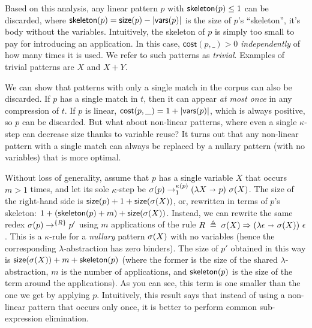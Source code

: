 %
Based on this analysis, any linear pattern $p$
 with $\mathsf{skeleton}(p) \leq 1$ can be discarded,
 where $\mathsf{skeleton}(p) = \mathsf{size}(p) - |\mathsf{vars}(p)|$ is the size of $p$'s ``skeleton'', \ie it's body without the variables.
%
Intuitively, the skeleton of $p$ is simply too small to pay for introducing an application.
%
In this case, $\mathsf{cost}(p,\_) > 0$ \emph{independently} of how many times it is used.
%
We refer to such patterns as \emph{trivial}.
%
Examples of trivial patterns are $X$ and $X + Y$.



%
We can show that patterns with only a single match in the corpus can also be discarded.
%
If $p$ has a single match in $t$,
then it can appear \emph{at most once} in any compression of $t$.
%
If $p$ is linear, $\mathsf{cost}(p, \_) = 1 + |\mathsf{vars}(p)|$,
which is always positive, so $p$ can be discarded.
%
But what about non-linear patterns, where even a single $\kappa$-step can decrease size thanks to variable reuse?
%
It turns out that any non-linear pattern with a single match
can always be replaced by a nullary pattern (with no variables) that is more optimal.

Without loss of generality, assume that $p$ has a single variable $X$ that occurs $m > 1$ times,
and let its sole $\kappa$-step be ${\sigma}({p}) \rightarrow^{\kappa(p)}_1  (\lambda X \ \mathbf{\shortrightarrow}\  p)\  {\sigma}({X})$.
%
The size of the right-hand side is $\mathsf{size}(p) + 1 + \mathsf{size}({\sigma}({X}))$,
or, rewritten in terms of $p$'s skeleton: $1 + (\mathsf{skeleton}(p) + m) + \mathsf{size}({\sigma}({X}))$.
%
Instead, we can rewrite the same redex ${\sigma}({p}) \rightarrow^{\{R\}} p'$
using $m$ applications of the rule $R \;\triangleq\; \sapp{\sigma}{X} \Rightarrow (\lambda \epsilon \bnd \sapp{\sigma}{X})\ \epsilon$.
%
This is a $\kappa$-rule for a \emph{nullary} pattern ${\sigma}({X})$ with no variables
(hence the corresponding $\lambda$-abstraction has zero binders).
%
The size of $p'$ obtained in this way is $\mathsf{size}({\sigma}({X})) + m + \mathsf{skeleton}(p)$
(where the former is the size of the shared $\lambda$-abstraction, $m$ is the number of applications, 
and $\mathsf{skeleton}(p)$ is the size of the term around the applications).
%
As you can see, this term is one smaller than the one we get by applying $p$.
%
Intuitively, this result says that instead of using a non-linear pattern that occurs only once,
it is better to perform common sub-expression elimination.

